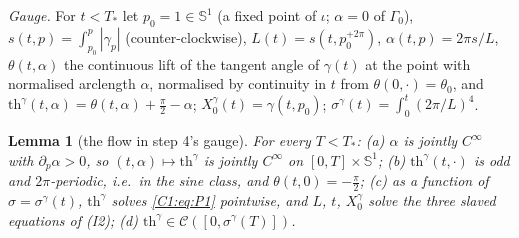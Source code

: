 \documentclass[11pt]{article}
\newtheorem{lemma}{Lemma}[section]\newtheorem{proposition}[lemma]{Proposition}\newtheorem{theorem}[lemma]{Theorem}\newtheorem{remark}[lemma]{Remark}
\begin{document}
\noindent\emph{Gauge.} For $t<T_*$ let $p_0=1\in\mathbb S^1$ (a fixed point of $\iota$; $\alpha=0$ of $\Gamma_0$), $s(t,p)=\int_{p_0}^p|\gamma_p|$ (counter-clockwise), $L(t)=s(t,p_0^{+2\pi})$, $\alpha(t,p)=2\pi s/L$, $\theta(t,\alpha)$ the continuous lift of the tangent angle of $\gamma(t)$ at the point with normalised arclength $\alpha$, normalised by continuity in $t$ from $\theta(0,\cdot)=\theta_0$, and $\mathrm{th}^\gamma(t,\alpha)=\theta(t,\alpha)+\frac\pi2-\alpha$; $X^\gamma_0(t)=\gamma(t,p_0)$; $\sigma^\gamma(t)=\int_0^t(2\pi/L)^4$.

\begin{lemma}[the flow in step 4's gauge]\label{C1:lem:gauge}
For every $T<T_*$: (a) $\alpha$ is jointly $C^\infty$ with $\partial_p\alpha>0$, so $(t,\alpha)\mapsto\mathrm{th}^\gamma$ is jointly $C^\infty$ on $[0,T]\times\mathbb S^1$; (b) $\mathrm{th}^\gamma(t,\cdot)$ is odd and $2\pi$-periodic, i.e.\ in the sine class, and $\theta(t,0)=-\frac\pi2$; (c) as a function of $\sigma=\sigma^\gamma(t)$, $\mathrm{th}^\gamma$ solves \eqref{C1:eq:P1} pointwise, and $L$, $t$, $X_0^\gamma$ solve the three slaved equations of (I2); (d) $\mathrm{th}^\gamma\in\mathcal C([0,\sigma^\gamma(T)])$.
\end{lemma}
\end{document}
